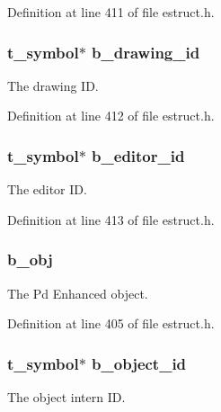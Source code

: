 Definition at line 411 of file estruct.\-h.

\hypertarget{struct__ebox_a153f9c9929d722ecb29217f3fb0914c9}{
\subsubsection[{b\-\_\-drawing\-\_\-id}]{\setlength{\rightskip}{0pt plus 5cm}t\-\_\-symbol$\ast$ b\-\_\-drawing\-\_\-id}}\label{struct__ebox_a153f9c9929d722ecb29217f3fb0914c9}
The drawing I\-D. 

Definition at line 412 of file estruct.\-h.

\hypertarget{struct__ebox_adf8c80c6ea45ad810c754984d98830ff}{
\subsubsection[{b\-\_\-editor\-\_\-id}]{\setlength{\rightskip}{0pt plus 5cm}t\-\_\-symbol$\ast$ b\-\_\-editor\-\_\-id}}\label{struct__ebox_adf8c80c6ea45ad810c754984d98830ff}
The editor I\-D. 

Definition at line 413 of file estruct.\-h.

\hypertarget{struct__ebox_a384a670299e98768527fbe457de9a38a}{
\subsubsection[{b\-\_\-obj}]{ b\-\_\-obj}}\label{struct__ebox_a384a670299e98768527fbe457de9a38a}
The Pd Enhanced object. 

Definition at line 405 of file estruct.\-h.

\hypertarget{struct__ebox_ae34af00c0a1b333cb06b30666f0ffc39}{
\subsubsection[{b\-\_\-object\-\_\-id}]{\setlength{\rightskip}{0pt plus 5cm}t\-\_\-symbol$\ast$ b\-\_\-object\-\_\-id}}\label{struct__ebox_ae34af00c0a1b333cb06b30666f0ffc39}
The object intern I\-D. 

